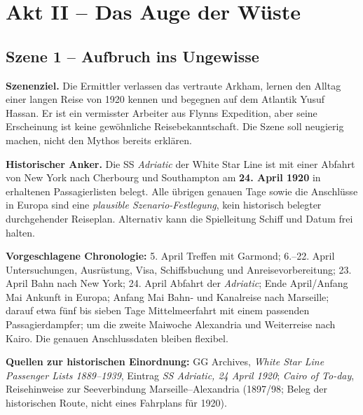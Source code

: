 
\chapter{Akt II -- Das Auge der Wüste}
\section{Szene 1 -- Aufbruch ins Ungewisse}
\begin{meisterinfo}
\textbf{Szenenziel.} Die Ermittler verlassen das vertraute Arkham, lernen den Alltag einer langen Reise von 1920 kennen und begegnen auf dem Atlantik Yusuf Hassan. Er ist ein vermisster Arbeiter aus Flynns Expedition, aber seine Erscheinung ist keine gewöhnliche Reisebekanntschaft. Die Szene soll neugierig machen, nicht den Mythos bereits erklären.

\textbf{Historischer Anker.} Die SS \emph{Adriatic} der White Star Line ist mit einer Abfahrt von New York nach Cherbourg und Southampton am \textbf{24. April 1920} in erhaltenen Passagierlisten belegt. Alle übrigen genauen Tage sowie die Anschlüsse in Europa sind eine \emph{plausible Szenario-Festlegung}, kein historisch belegter durchgehender Reiseplan. Alternativ kann die Spielleitung Schiff und Datum frei halten.

\textbf{Vorgeschlagene Chronologie:} 5. April Treffen mit Garmond; 6.--22. April Untersuchungen, Ausrüstung, Visa, Schiffsbuchung und Anreisevorbereitung; 23. April Bahn nach New York; 24. April Abfahrt der \emph{Adriatic}; Ende April/Anfang Mai Ankunft in Europa; Anfang Mai Bahn- und Kanalreise nach Marseille; darauf etwa fünf bis sieben Tage Mittelmeerfahrt mit einem passenden Passagierdampfer; um die zweite Maiwoche Alexandria und Weiterreise nach Kairo. Die genauen Anschlussdaten bleiben flexibel.

\textbf{Quellen zur historischen Einordnung:} GG Archives, \emph{White Star Line Passenger Lists 1889--1939}, Eintrag \emph{SS Adriatic, 24 April 1920}; \emph{Cairo of To-day}, Reisehinweise zur Seeverbindung Marseille--Alexandria (1897/98; Beleg der historischen Route, nicht eines Fahrplans für 1920).
\end{meisterinfo}


